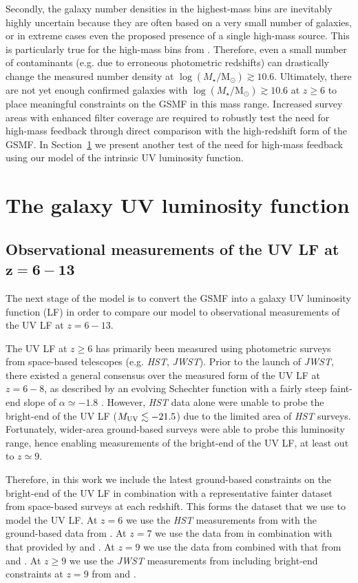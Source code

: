 \documentclass[fleqn,usenatbib]{mnras}
\begin{document}
Secondly, the galaxy number densities in the highest-mass bins are inevitably highly uncertain because they are often based on a very small number of galaxies, or in extreme cases even the proposed presence of a single high-mass source. This is particularly true for the high-mass bins from \citet{shuntov2024}. Therefore, even a small number of contaminants (e.g. due to erroneous photometric redshifts) can drastically change the measured number density at $\log(M_{\star}/ \mathrm{M_{\odot}})\gtrsim10.6$. 
Ultimately, there are not yet enough confirmed galaxies with $\log(M_{\star}/ \mathrm{M_{\odot}})\gtrsim10.6$ at $z\geq6$ to place meaningful constraints on the GSMF in this mass range. Increased survey areas with enhanced filter coverage are required to robustly test the need for high-mass feedback through direct comparison with the high-redshift form of the GSMF. In Section~\ref{sec:LF} we present another test of the need for high-mass feedback using our model of the intrinsic UV luminosity function. 

\section{The galaxy UV luminosity function}
\label{sec:LF}
\subsection{Observational measurements of the UV LF at $\mathbf{z=6-13}$}
The next stage of the model is to convert the GSMF into a galaxy UV luminosity function (LF) in order to compare our model to observational measurements of the UV LF at $z=6-13$. 

The UV LF at $z\geq6$ has primarily been measured using photometric surveys from space-based telescopes (e.g. \textit{HST}, \textit{JWST}). Prior to the launch of \textit{JWST}, there existed a general consensus over the measured form of the UV LF at $z=6-8$, as described by an evolving Schechter function with a fairly steep faint-end slope of $\alpha \simeq -1.8$ \citep[e.g.][]{bouwens2007,mclure2009,mclure2010,bouwens2021}. However, \textit{HST} data alone were unable to probe the bright-end of the UV LF ($M_{\rm UV}\lesssim-21.5$) due to the limited area of \textit{HST} surveys. Fortunately, wider-area ground-based surveys were able to probe this luminosity range, hence enabling measurements of the bright-end of the UV LF, at least out to $z \simeq 9$. 

Therefore, in this work we include the latest ground-based constraints on the bright-end of the UV LF in combination with a representative fainter dataset from space-based surveys at each redshift. This forms the dataset that we use to model the UV LF. At $z=6$ we use the \textit{HST} measurements from \citet{bouwens2021} with the ground-based data from \citet{bowler2015}. At $z=7$ we use the data from \citet{mclure2013} in combination with that provided by \citet{bowler2017} and \citet{varadaraj2023}. At $z=9$ we use the data from \citet{mclure2013} combined with that from \citet{bowler2020} and \citet{donnan2023a}. At $z\geq9$ we use the \textit{JWST} measurements from \citet{donnan2024} including bright-end constraints at $z=9$ from \citet{bowler2020} and \citet{donnan2023a}. 
\end{document}

